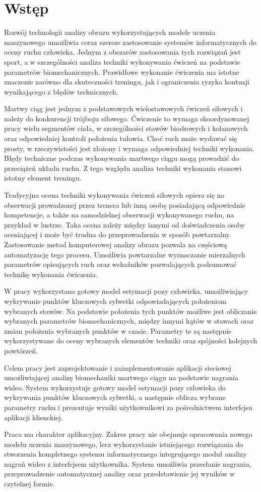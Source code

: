 \section*{Wstęp}

Rozwój technologii analizy obrazu wykorzystujących modele uczenia maszynowego umożliwia coraz szersze zastosowanie systemów informatycznych do oceny ruchu człowieka. Jednym z obszarów zastosowania tych rozwiązań jest sport, a w szczególności analiza techniki wykonywania ćwiczeń na podstawie parametrów biomechanicznych. Prawidłowe wykonanie ćwiczenia ma istotne znaczenie zarówno dla skuteczności treningu, jak i ograniczenia ryzyka kontuzji wynikającego z błędów technicznych.

Martwy ciąg jest jednym z podstawowych wielostawowych ćwiczeń siłowych i należy do konkurencji trójboju siłowego. Ćwiczenie to wymaga skoordynowanej pracy wielu segmentów ciała, w szczególności stawów biodrowych i kolanowych oraz odpowiedniej kontroli położenia tułowia. Choć ruch może wydawać się prosty, w rzeczywistości jest złożony i wymaga odpowiedniej techniki wykonania. Błędy techniczne podczas wykonywania martwego ciągu mogą prowadzić do przeciążeń układu ruchu. Z tego względu analiza techniki wykonania stanowi istotny element treningu.

Tradycyjna ocena techniki wykonywania ćwiczeń siłowych opiera się na obserwacji prowadzonej przez trenera lub inną osobę posiadającą odpowiednie kompetencje, a także na samodzielnej obserwacji wykonywanego ruchu, na przykład w lustrze. Taka ocena zależy między innymi od doświadczenia osoby oceniającej i może być trudna do przeprowadzenia w sposób powtarzalny. Zastosowanie metod komputerowej analizy obrazu pozwala na częściową automatyzację tego procesu. Umożliwia powtarzalne wyznaczanie mierzalnych parametrów opisujących ruch oraz wskaźników pozwalających podsumować technikę wykonania ćwiczenia.

W pracy wykorzystano gotowy model estymacji pozy człowieka, umożliwiający wykrywanie punktów kluczowych sylwetki odpowiadających położeniom wybranych stawów. Na podstawie położenia tych punktów możliwe jest obliczanie wybranych parametrów biomechanicznych, między innymi kątów w stawach oraz zmian położenia wybranych punktów w czasie. Parametry te są następnie wykorzystywane do oceny wybranych elementów techniki oraz spójności kolejnych powtórzeń.

Celem pracy jest zaprojektowanie i zaimplementowanie aplikacji sieciowej umożliwiającej analizę biomechaniki martwego ciągu na podstawie nagrania wideo. System wykorzystuje gotowy model estymacji pozy człowieka do wykrywania punktów kluczowych sylwetki, a następnie oblicza wybrane parametry ruchu i prezentuje wyniki użytkownikowi za pośrednictwem interfejsu aplikacji klienckiej.

Praca ma charakter aplikacyjny. Zakres pracy nie obejmuje opracowania nowego modelu uczenia maszynowego, lecz wykorzystanie istniejącego rozwiązania do stworzenia kompletnego systemu informatycznego integrującego moduł analizy nagrań wideo z interfejsem użytkownika. System umożliwia przesłanie nagrania, przeprowadzenie automatycznej analizy oraz przedstawienie jej wyników w czytelnej formie.